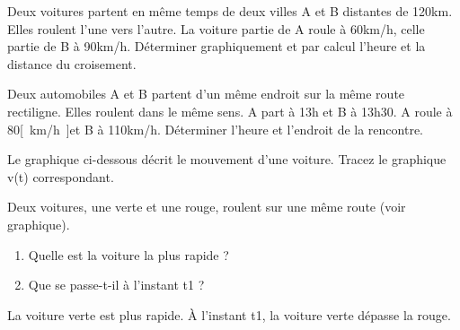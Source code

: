 \begin{exercise}
    Deux voitures partent en même temps de deux villes A et B distantes de 120km. Elles roulent l'une vers l'autre. La voiture partie de A roule à 60km/h, celle partie de B à 90km/h. Déterminer graphiquement et par calcul l'heure et la distance du croisement.
\end{exercise}
\begin{solution}
\end{solution}

\begin{exercise}
    Deux automobiles A et B partent d'un même endroit sur la même route rectiligne. Elles roulent dans le même sens. A part à 13h et B à 13h30. A roule à 80\unit{[km/h]}et B à 110km/h. Déterminer l'heure et l'endroit de la rencontre.
\end{exercise}
\begin{solution}
\end{solution}

\begin{exercise}
    Le graphique ci-dessous décrit le mouvement d'une voiture. Tracez le graphique v(t) correspondant.

\end{exercise}

\begin{exercise}
    Deux voitures, une verte et une rouge, roulent sur une même route (voir graphique).
    \begin{enumerate}[label=\alph*)]
        \item Quelle est la voiture la plus rapide ?
        \item Que se passe-t-il à l'instant t1 ?
    \end{enumerate}

\end{exercise}
\begin{solution}
    La voiture verte est plus rapide. À l'instant t1, la voiture verte dépasse la rouge.
\end{solution}

